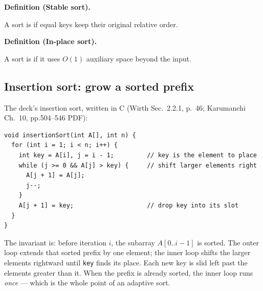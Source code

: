 \documentclass[11pt]{article}
\newenvironment{definitionbox}[1]{%
  \par\noindent\textbf{Definition (#1).}\ \itshape
}{\par\vspace{0.3em}}
\begin{document}
\begin{definitionbox}{Stable sort}
A sort is  if equal keys keep their original relative order.
\end{definitionbox}

\begin{definitionbox}{In-place sort}
A sort is  if it uses $O(1)$ auxiliary space beyond the input.
\end{definitionbox}


\subsection{Insertion sort: grow a sorted prefix}

The deck's insertion sort, written in C (Wirth Sec.~2.2.1, p.~46; Karumanchi Ch.~10, pp.504--546 PDF):

{\footnotesize
\begin{verbatim}
void insertionSort(int A[], int n) {
  for (int i = 1; i < n; i++) {
    int key = A[i], j = i - 1;         // key is the element to place
    while (j >= 0 && A[j] > key) {     // shift larger elements right
      A[j + 1] = A[j];
      j--;
    }
    A[j + 1] = key;                    // drop key into its slot
  }
}
\end{verbatim}
}

The invariant is: before iteration $i$, the subarray $A[0..i-1]$ is sorted. The outer loop extends that sorted prefix by one element; the inner loop shifts the larger elements rightward until \texttt{key} finds its place. Each new key is slid left past the elements greater than it. When the prefix is already sorted, the inner loop runs \emph{once} --- which is the whole point of an adaptive sort.
\end{document}
